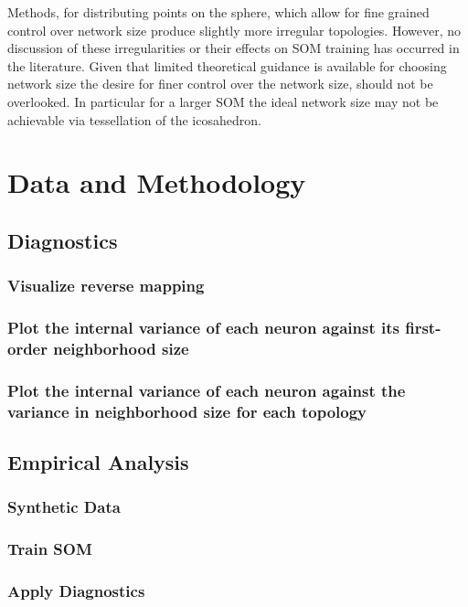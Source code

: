 \documentclass[11pt]{article}
\begin{document}
Methods, for distributing points on the sphere, which allow for fine grained control over network size produce slightly more irregular topologies.  However, no discussion of these irregularities or their effects on SOM training has occurred in the literature. Given that limited theoretical guidance is available for choosing network size the desire for finer control over the network size, should not be overlooked. In particular for a larger SOM the ideal network size may not be achievable via tessellation of the icosahedron.

\section{Data and Methodology}

\subsection{Diagnostics}
\subsubsection{Visualize reverse mapping}
\subsubsection{Plot the internal variance of each neuron against its first-order neighborhood size}
\subsubsection{Plot the internal variance of each neuron against the variance in
neighborhood size for each topology}

\subsection{Empirical Analysis}
\subsubsection{Synthetic Data}
\subsubsection{Train SOM}
\subsubsection{Apply Diagnostics}
\end{document}
